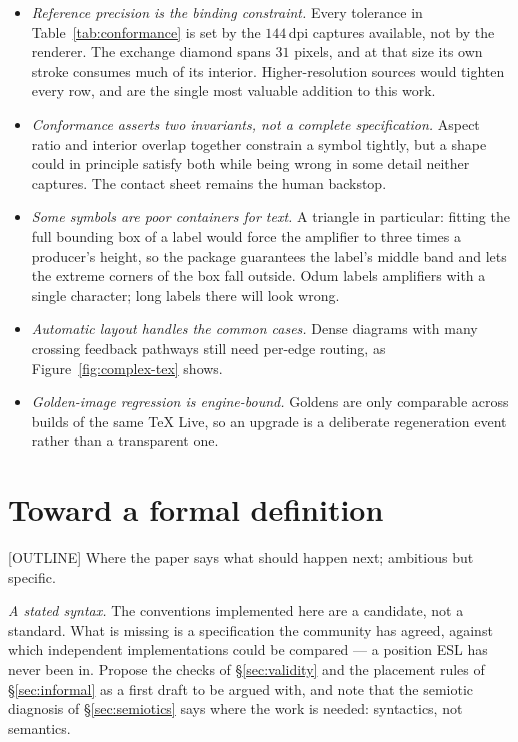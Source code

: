 \begin{itemize}
  \item \emph{Reference precision is the binding constraint.} Every tolerance in
        Table~\ref{tab:conformance} is set by the $144$\,dpi captures available,
        not by the renderer. The exchange diamond spans $31$ pixels, and at that
        size its own stroke consumes much of its interior. Higher-resolution
        sources would tighten every row, and are the single most valuable
        addition to this work.
  \item \emph{Conformance asserts two invariants, not a complete
        specification.} Aspect ratio and interior overlap together constrain a
        symbol tightly, but a shape could in principle satisfy both while being
        wrong in some detail neither captures. The contact sheet remains the
        human backstop.
  \item \emph{Some symbols are poor containers for text.} A triangle in
        particular: fitting the full bounding box of a label would force the
        amplifier to three times a producer's height, so the package guarantees
        the label's middle band and lets the extreme corners of the box fall
        outside. Odum labels amplifiers with a single character; long labels
        there will look wrong.
  \item \emph{Automatic layout handles the common cases.} Dense diagrams with
        many crossing feedback pathways still need per-edge routing, as
        Figure~\ref{fig:complex-tex} shows.
  \item \emph{Golden-image regression is engine-bound.} Goldens are only
        comparable across builds of the same \TeX{} Live, so an upgrade is a
        deliberate regeneration event rather than a transparent one.
\end{itemize}

\section{Toward a formal definition}
\label{sec:future-formal}

[OUTLINE] Where the paper says what should happen next; ambitious but specific.

\emph{A stated syntax.} The conventions implemented here are a candidate, not a
standard. What is missing is a specification the community has agreed, against
which independent implementations could be compared --- a position ESL has never
been in. Propose the checks of \S\ref{sec:validity} and the placement rules of
\S\ref{sec:informal} as a first draft to be argued with, and note that the
semiotic diagnosis of \S\ref{sec:semiotics} says where the work is needed:
syntactics, not semantics.

